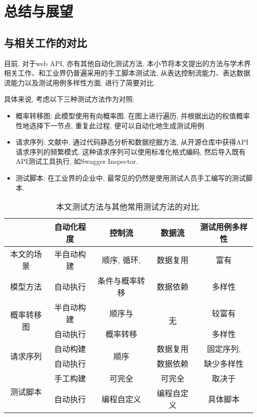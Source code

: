\chapter{总结与展望}
    \section{与相关工作的对比}
        目前, 对于web API, 亦有其他自动化测试方法. 本小节将本文提出的方法与学术界相关工作、和工业界仍普遍采用的手工脚本测试法, 从表达控制流能力、表达数据流能力以及测试用例多样性方面, 进行了简要对比.
    
        具体来说, 考虑以下三种测试方法作为对照:
        \begin{itemize}
            \item 概率转移图\cite{junyiw17}: 此模型使用有向概率图. 在图上进行遍历, 并根据出边的权值概率性地选择下一节点, 重复此过程, 便可以自动化地生成测试用例.
            
            \item 请求序列: 文献\cite{taox06}\cite{xiaodongg16}中, 通过代码静态分析和数据挖掘方法, 从开源仓库中获得API请求序列的频繁模式. 这种请求序列可以使用标准化格式编码, 然后导入既有API测试工具执行, 如Swagger Inspector\cite{swaggerinspetor17}.
            
            \item 测试脚本: 在工业界的企业中, 最常见的仍然是使用测试人员手工编写的测试脚本.
        \end{itemize}
        
        \begin{table}[!htb]
            \centering
            \begin{tabular}{ccccc}
                \toprule
                 & 自动化程度 & 控制流 & 数据流 & 测试用例多样性 \\
                \midrule
                本文的场景 & 半自动构建 & 顺序, 循环,  & 数据复用 & 富有 \\
                模型方法   & 自动执行 & 条件与概率转移 & 数据依赖 & 多样性 \\
                \hline
                \multirow{2}{*}{概率转移图\cite{junyiw17}} & 半自动构建 & 顺序与 & \multirow{2}{*}{无} & 较富有 \\
                & 自动执行 & 概率转移 &  & 多样性 \\
                \hline
                \multirow{2}{*}{请求序列\cite{taox06}\cite{xiaodongg16}} & 自动构建 & \multirow{2}{*}{顺序} & 数据复用 & 固定序列, \\
                & 自动执行 &  & 数据依赖 & 缺少多样性 \\
                \hline
                \multirow{2}{*}{测试脚本} & 手工构建 & 可完全 & 可完全 & 取决于 \\
                & 自动执行 & 编程自定义 & 编程自定义 & 具体脚本 \\
                \bottomrule
            \end{tabular}
            \caption{本文测试方法与其他常用测试方法的对比.}
            \label{tab:related_work_compare}
        \end{table}
        
